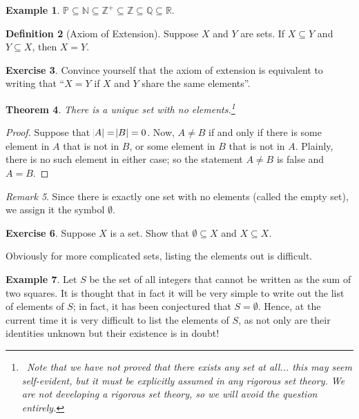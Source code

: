 \documentclass[a4paper, 10pt]{amsart}
\newtheorem{thm}{Theorem}[section]
\theoremstyle{definition}
\newtheorem{defn}[thm]{Definition}
\newtheorem{ex}[thm]{Example}
\newtheorem{exercise}[thm]{Exercise}
\theoremstyle{remark}
\newtheorem{rem}[thm]{Remark}
\begin{document}
\begin{ex}
  $ \mathbb{P} \subseteq \mathbb{N} \subseteq \mathbb{Z}^+ \subseteq \mathbb{Z} \subseteq \mathbb{Q} \subseteq \mathbb{R} $.
\end{ex}

\begin{defn}[Axiom of Extension]
  Suppose $ X $ and $ Y $ are sets. If $ X \subseteq Y $ and $ Y \subseteq X $, then $ X = Y $.
\end{defn}

\begin{exercise}
  Convince yourself that the axiom of extension is equivalent to writing that ``$ X = Y $ if $ X $ and $ Y $ share the same elements''.
\end{exercise}

\begin{thm}
  There is a unique set with no elements.\footnote{~Note that we have not proved that there exists any set at all... this may seem
  self-evident, but it must be explicitly assumed in any rigorous set theory. We are not developing a rigorous set theory, so we will
  avoid the question entirely.}
\end{thm}
\begin{proof}
  Suppose that $ \abs{A} = \abs{B} = 0 $. Now, $ A \neq B $ if and only if there is some element in $ A $ that is not in $ B $,
  or some element in $ B $ that is not in $ A $. Plainly, there is no such element in either case; so the statement $ A \neq B $ is
  false and $ A = B $.
\end{proof}

\begin{rem}
  Since there is exactly one set with no elements (called the empty set), we assign it the symbol $ \emptyset $.
\end{rem}

\begin{exercise}
  Suppose $ X $ is a set. Show that $ \emptyset \subseteq X $ and $ X \subseteq X $.
\end{exercise}

Obviously for more complicated sets, listing the elements out is difficult.
\begin{ex}\label{ex:sumsquare}
  Let $ S $ be the set of all integers that cannot be written as the sum of two squares.
  It is thought that in fact it will be very simple to write out the list of elements of $ S $; in fact,
  it has been conjectured that $ S = \emptyset $. Hence, at the current time it is very difficult to
  list the elements of $ S $, as not only are their identities unknown but their existence is in doubt!
\end{ex}
\end{document}
